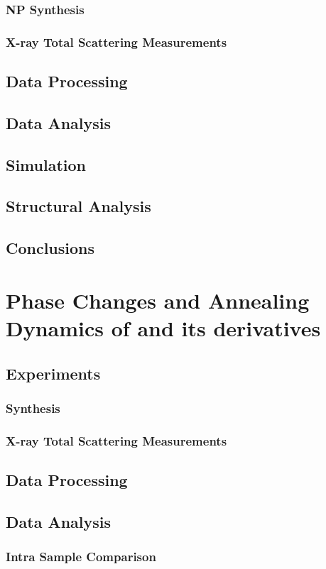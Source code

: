 \documentclass{uscthesis}
\theoremstyle{definition}
\theoremstyle{plain}
\begin{document}
\subsection{NP Synthesis}
\subsection{X-ray Total Scattering Measurements}
\section{Data Processing}
\section{Data Analysis}
\section{Simulation}
\section{Structural Analysis}
\section{Conclusions}

\chapter{Phase Changes and Annealing Dynamics of  and its derivatives}
\section{Experiments}
\subsection{ Synthesis}
\subsection{X-ray Total Scattering Measurements}
\section{Data Processing}
\section{Data Analysis}
\subsection{Intra Sample Comparison}
\end{document}
